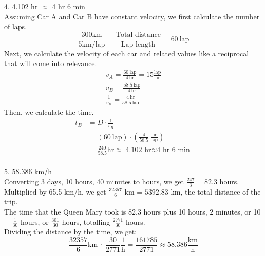 \documentclass[12pt]{article}
\begin{document}
4. 4.102 hr $\approx$ 4 hr 6 min \\
Assuming Car A and Car B have constant velocity, we first calculate the number of laps.
\begin{equation*}
    \frac{300 \unit{\kilo\meter}}{5 \unit{\kilo\meter}/\text{lap}} = \frac{\text{Total\ distance}}{\text{Lap\ length}} = 60\ \text{lap}
\end{equation*}
Next, we calculate the velocity of each car and related values like a reciprocal that will come into relevance.
\begin{eqnarray*}
    v_A = \frac{60\ \text{lap}}{4\ \text{hr}} = 15 \frac{\text{lap}}{\text{hr}} \\
    v_B = \frac{58.5\ \text{lap}}{4\ \text{hr}} \\
    \frac{1}{v_B} = \frac{4\ \text{hr}}{58.5\ \text{lap}}
\end{eqnarray*}
Then, we calculate the time.
\begin{align*}
    t_B &= D \cdot \frac{1}{v_B} \\
    &= (60\ \text{lap}) \cdot \left( \frac{4}{58.5}\ \frac{\text{hr}}{\text{lap}} \right) \\
    &= \frac{240}{58.5} \text{hr} \approx \boxed{ \text{4.102\ hr} \approx \text{4\ hr\ 6\ min} }
\end{align*}
\\
5. 58.386 km/h \\
Converting 3 days, 10 hours, 40 minutes to hours, we get $\frac{247}{3} = 82.\bar{3}$ hours. \\
Multiplied by 65.5 km/h, we get $\frac{32357}{6}$ km = $5392.8\bar{3}$ km, the total distance of the trip. \\
The time that the Queen Mary took is $82.\bar{3}$ hours plus 10 hours, 2 minutes, or 10 + $\frac{1}{30}$ hours, or $\frac{301}{30}$ hours, totalling $\frac{2771}{30}$ hours. \\
Dividing the distance by the time, we get:
\begin{equation*}
    \frac{32357}{6} \unit{\kilo\meter}\ \cdot\ \frac{30}{2771} \frac{1}{\unit{\hour}} = \boxed{\frac{161785}{2771} \approx 58.386 \frac{\unit{\kilo\meter}}{\unit{\hour}}}
\end{equation*}
\end{document}
